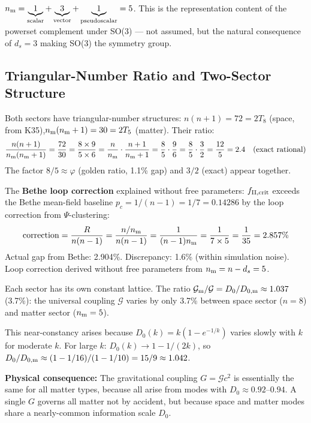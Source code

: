\documentclass[12pt, a4paper]{article}
\begin{document}
$n_{\rm m} = \underbrace{1}_{\rm scalar} + \underbrace{3}_{\rm vector} + \underbrace{1}_{\rm pseudoscalar} = 5$.
This is the representation content of the powerset complement under SO(3) ---
not assumed, but the natural consequence of $d_s=3$ making SO(3) the symmetry group.

\subsection{Triangular-Number Ratio and Two-Sector Structure}

Both sectors have triangular-number structures:
$n(n+1) = 72 = 2T_8$ (space, from K35),\quad $n_{\rm m}(n_{\rm m}+1) = 30 = 2T_5$ (matter).
Their ratio:
\[
  \frac{n(n+1)}{n_{\rm m}(n_{\rm m}+1)} = \frac{72}{30} = \frac{8\times 9}{5\times 6}
  = \frac{n}{n_{\rm m}}\cdot\frac{n+1}{n_{\rm m}+1} = \frac{8}{5}\cdot\frac{9}{6}
  = \frac{8}{5}\cdot\frac{3}{2} = \frac{12}{5} = 2.4 \quad \text{(exact rational)}
\]
The factor $8/5 \approx \varphi$ (golden ratio, 1.1\% gap) and $3/2$ (exact) appear together.

The \textbf{Bethe loop correction} explained without free parameters:
$f_{\rm II,crit}$ exceeds the Bethe mean-field baseline $p_c = 1/(n-1) = 1/7 = 0.14286$
by the loop correction from $\Psi$-clustering:
\[
  {\rm correction} = \frac{R}{n(n-1)} = \frac{n/n_{\rm m}}{n(n-1)}
  = \frac{1}{(n-1)n_{\rm m}} = \frac{1}{7\times 5} = \frac{1}{35} = 2.857\%
\]
Actual gap from Bethe: 2.904\%. Discrepancy: 1.6\% (within simulation noise).
Loop correction derived without free parameters from $n_{\rm m} = n - d_s = 5$.

\begin{derivedbox}[title={$\mathcal{G}$ is Approximately Universal Across Space and Matter Sectors}]
Each sector has its own constant lattice. The ratio $\mathcal{G}_{\rm m}/\mathcal{G} = D_0/D_{0,{\rm m}} \approx 1.037$ (3.7\%): the universal coupling $\mathcal{G}$ varies by only 3.7\% between space sector ($n=8$) and matter sector ($n_{\rm m}=5$).

This near-constancy arises because $D_0(k) = k(1-e^{-1/k})$ varies slowly with $k$ for moderate $k$. For large $k$: $D_0(k)\to 1-1/(2k)$, so $D_0/D_{0,{\rm m}} \approx (1-1/16)/(1-1/10) = 15/9 \approx 1.042$.

\textbf{Physical consequence:} The gravitational coupling $G = \mathcal{G}c^2$ is essentially
the same for all matter types, because all arise from modes with $D_0\approx 0.92$--$0.94$.
A single $G$ governs all matter not by accident, but because space and matter modes share
a nearly-common information scale $D_0$.
\end{derivedbox}
\end{document}
